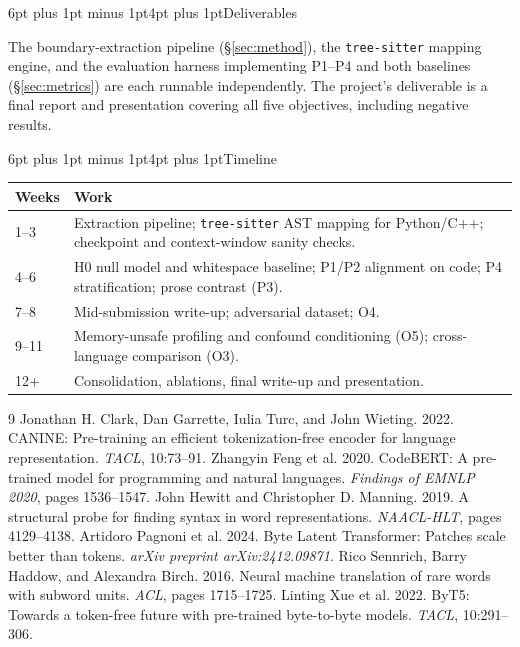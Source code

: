 \documentclass[10pt]{article}
\makeatletter
\renewcommand\section{\@startsection{section}{1}{0pt}%
  {6pt plus 1pt minus 1pt}{4pt plus 1pt}{\normalfont\large\bfseries}}
\newcommand{\code}[1]{\texttt{\small #1}}
\makeatother
\begin{document}
\section{Deliverables}

The boundary-extraction pipeline (\S\ref{sec:method}), the \code{tree-sitter}
mapping engine, and the evaluation harness implementing P1--P4 and both
baselines (\S\ref{sec:metrics}) are each runnable independently. The
project's deliverable is a final report and presentation covering all five
objectives, including negative results.

\section{Timeline}

\begin{center}
\small
\begin{tabular}{@{}p{1.1cm}p{5.9cm}@{}}
\toprule
\textbf{Weeks} & \textbf{Work} \\
\midrule
1--3   & Extraction pipeline; \code{tree-sitter} AST mapping for Python/C++;
          checkpoint and context-window sanity checks. \\
4--6   & H0 null model and whitespace baseline; P1/P2 alignment on code; P4
          stratification; prose contrast (P3). \\
7--8   & Mid-submission write-up; adversarial dataset; O4. \\
9--11  & Memory-unsafe profiling and confound conditioning (O5); cross-language
          comparison (O3). \\
12+    & Consolidation, ablations, final write-up and presentation. \\
\bottomrule
\end{tabular}
\label{tab:timeline}
\end{center}

\begin{thebibliography}{9}
\footnotesize\setlength{\itemsep}{1pt}\setlength{\parskip}{0pt}
 Jonathan H. Clark, Dan Garrette,
Iulia Turc, and John Wieting. 2022. CANINE: Pre-training an efficient
tokenization-free encoder for language representation. \emph{TACL}, 10:73--91.
 Zhangyin Feng et al. 2020.
CodeBERT: A pre-trained model for programming and natural languages.
\emph{Findings of EMNLP 2020}, pages 1536--1547.
 John Hewitt and
Christopher D. Manning. 2019. A structural probe for finding syntax in word
representations. \emph{NAACL-HLT}, pages 4129--4138.
 Artidoro Pagnoni et al. 2024.
Byte Latent Transformer: Patches scale better than tokens. \emph{arXiv preprint
arXiv:2412.09871}.
 Rico Sennrich, Barry Haddow, and
Alexandra Birch. 2016. Neural machine translation of rare words with subword
units. \emph{ACL}, pages 1715--1725.
 Linting Xue et al. 2022. ByT5: Towards a
token-free future with pre-trained byte-to-byte models. \emph{TACL}, 10:291--306.
\end{thebibliography}
\end{document}
